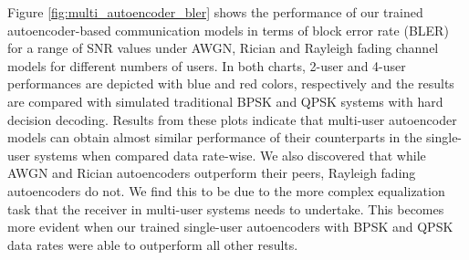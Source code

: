 Figure \ref{fig:multi_autoencoder_bler} shows the performance of our trained autoencoder-based communication models in terms of block error rate (BLER) for a range of SNR values under AWGN, Rician and Rayleigh fading channel models for different numbers of users. In both charts, 2-user and 4-user performances are depicted with blue and red colors, respectively and the results are compared with simulated traditional BPSK and QPSK systems with hard decision decoding. Results from these plots indicate that multi-user autoencoder models can obtain almost similar performance of their counterparts in the single-user systems when compared data rate-wise. We also discovered that while AWGN and Rician autoencoders outperform their peers, Rayleigh fading autoencoders do not. We find this to be due to the more complex equalization task that the receiver in multi-user systems needs to undertake. This becomes more evident when our trained single-user autoencoders with BPSK and QPSK data rates were able to outperform all other results.

